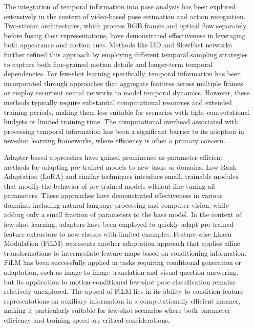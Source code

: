\documentclass[11pt]{article}
\begin{document}
The integration of temporal information into pose analysis has been explored extensively in the context of video-based pose estimation and action recognition. Two-stream architectures, which process RGB frames and optical flow separately before fusing their representations, have demonstrated effectiveness in leveraging both appearance and motion cues. Methods like I3D and SlowFast networks further refined this approach by employing different temporal sampling strategies to capture both fine-grained motion details and longer-term temporal dependencies. For few-shot learning specifically, temporal information has been incorporated through approaches that aggregate features across multiple frames or employ recurrent neural networks to model temporal dynamics. However, these methods typically require substantial computational resources and extended training periods, making them less suitable for scenarios with tight computational budgets or limited training time. The computational overhead associated with processing temporal information has been a significant barrier to its adoption in few-shot learning frameworks, where efficiency is often a primary concern.

Adapter-based approaches have gained prominence as parameter-efficient methods for adapting pre-trained models to new tasks or domains. Low-Rank Adaptation (LoRA) and similar techniques introduce small, trainable modules that modify the behavior of pre-trained models without fine-tuning all parameters. These approaches have demonstrated effectiveness in various domains, including natural language processing and computer vision, while adding only a small fraction of parameters to the base model. In the context of few-shot learning, adapters have been employed to quickly adapt pre-trained feature extractors to new classes with limited examples. Feature-wise Linear Modulation (FiLM) represents another adaptation approach that applies affine transformations to intermediate feature maps based on conditioning information. FiLM has been successfully applied in tasks requiring conditional generation or adaptation, such as image-to-image translation and visual question answering, but its application to motion-conditioned few-shot pose classification remains relatively unexplored. The appeal of FiLM lies in its ability to condition feature representations on auxiliary information in a computationally efficient manner, making it particularly suitable for few-shot scenarios where both parameter efficiency and training speed are critical considerations.
\end{document}
